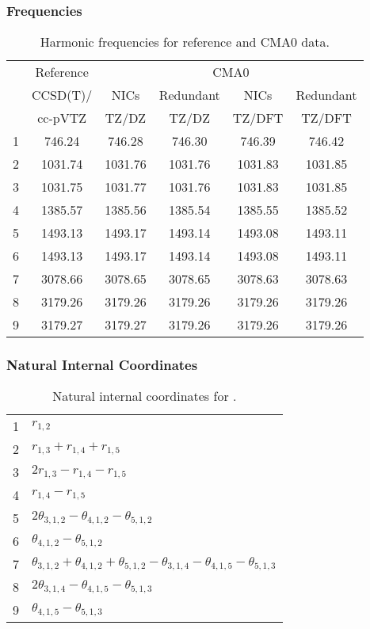 \documentclass[10pt,oneside]{article}
\begin{document}
\begin{table}[h!]
\subsubsection*{Frequencies}
\centering
\caption{Harmonic frequencies for reference and CMA0 data.}
\begin{tabular}{cccccc}
\toprule
{} & Reference & \multicolumn{4}{c}{CMA0} \\
{} &  CCSD(T)/ &    NICs &  Redundant &    NICs & Redundant \\
{} &   cc-pVTZ &   TZ/DZ &      TZ/DZ &  TZ/DFT &    TZ/DFT \\
\midrule
1 &    746.24 &  746.28 &     746.30 &  746.39 &    746.42 \\
2 &   1031.74 & 1031.76 &    1031.76 & 1031.83 &   1031.85 \\
3 &   1031.75 & 1031.77 &    1031.76 & 1031.83 &   1031.85 \\
4 &   1385.57 & 1385.56 &    1385.54 & 1385.55 &   1385.52 \\
5 &   1493.13 & 1493.17 &    1493.14 & 1493.08 &   1493.11 \\
6 &   1493.13 & 1493.17 &    1493.14 & 1493.08 &   1493.11 \\
7 &   3078.66 & 3078.65 &    3078.65 & 3078.63 &   3078.63 \\
8 &   3179.26 & 3179.26 &    3179.26 & 3179.26 &   3179.26 \\
9 &   3179.27 & 3179.27 &    3179.26 & 3179.26 &   3179.26 \\
\bottomrule
\end{tabular}
\end{table}

\begin{table}[h!]
\subsubsection*{Natural Internal Coordinates}
\centering
\caption{Natural internal coordinates for .}
\small
\begin{tabular}{ll}
\toprule
  1   & $r_{1,2}$ \\
  2   & $r_{1,3} + r_{1,4} + r_{1,5}$ \\
  3   & $2r_{1,3} - r_{1,4} - r_{1,5}$ \\
  4   & $r_{1,4} - r_{1,5}$ \\
  5   & $2\theta_{3,1,2} - \theta_{4,1,2} - \theta_{5,1,2}$ \\
  6   & $\theta_{4,1,2} - \theta_{5,1,2}$ \\
  7   & $\theta_{3,1,2} + \theta_{4,1,2} + \theta_{5,1,2} - \theta_{3,1,4} - \theta_{4,1,5} - \theta_{5,1,3}$ \\
  8   & $2\theta_{3,1,4} - \theta_{4,1,5} - \theta_{5,1,3}$ \\
  9   & $\theta_{4,1,5} - \theta_{5,1,3}$ \\
\bottomrule
\end{tabular}
\end{table}
\end{document}
